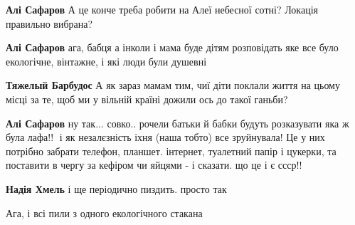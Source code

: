 \begin{itemize}
\begin{itemize}
\textbf{Алі Сафаров} А це конче треба робити на Алеї небесної сотні? Локація правильно вибрана?

 
\textbf{Алі Сафаров} ага, бабця а інколи і мама буде дітям розповідать яке все було екологічне, вінтажне, і які люди були душевні

 
\textbf{Тяжелый Барбудос}
А як зараз мамам тим, чиї діти поклали життя на цьому місці за те, щоб ми у вільній країні дожили ось до такої ганьби?

 
\textbf{Алі Сафаров} ну так... совко.. рочели батьки й бабки будуть розказувати яка ж була лафа!!🤬 і як незалєзність іхня (наша тобто) все зруйнувала!
Це у них потрібно забрати телефон, планшет. інтернет, туалетний папір і цукерки, та поставити в чергу за кефіром чи яйцями - і сказати. що це і є ссср!!

 
\textbf{Надія Хмель} і ще періодично пиздить. просто так

 
Ага, і всі пили з одного екологічного стакана

 

\end{itemize}
\end{itemize}
